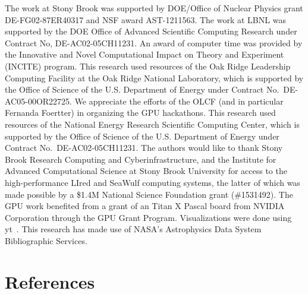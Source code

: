 \documentclass[a4paper]{jpconf}
\begin{document}
\ack The work at Stony Brook was supported by DOE/Office of Nuclear
Physics grant DE-FG02-87ER40317 and NSF award AST-1211563.  The work
at LBNL was supported by the DOE Office of Advanced Scientific
Computing Research under Contract No, DE-AC02-05CH11231. An award of
computer time was provided by the Innovative and Novel Computational
Impact on Theory and Experiment (INCITE) program.  This research used
resources of the Oak Ridge Leadership Computing Facility at the Oak
Ridge National Laboratory, which is supported by the Office of Science
of the U.S. Department of Energy under Contract
No.\ DE-AC05-00OR22725.  We appreciate the efforts of the OLCF (and in
particular Fernanda Foertter) in organizing the GPU hackathons.  This
research used resources of the National Energy Research Scientific
Computing Center, which is supported by the Office of Science of the
U.S. Department of Energy under Contract No.\ DE-AC02-05CH11231.
The authors would like to thank Stony Brook Research Computing
and Cyberinfrastructure, and the Institute for Advanced Computational
Science at Stony Brook University for access to the high-performance
LIred and SeaWulf computing systems, the latter of which was made
possible by a \$1.4M National Science Foundation grant (\#1531492).
The GPU work benefited from a grant of an Titan X Pascal board
from NVIDIA Corporation through the GPU Grant Program.
Visualizations were done using yt~\cite{yt}.  This research has
made use of NASA's Astrophysics Data System Bibliographic Services.

\section*{References}



\end{document}
